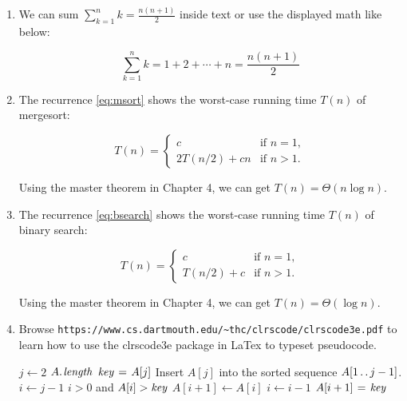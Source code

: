\documentclass[11pt]{article}
\begin{document}
\begin{enumerate}

\itemsep 0.35in

\item We can sum $\sum_{k=1}^{n} k = \frac{ n ( n + 1)}{2} $ inside text or
      use the displayed math like below:
      
      \[
        \sum_{k=1}^{n} k = 1 + 2 + \cdots + n = \frac{ n ( n + 1)}{2}
      \]

\item The recurrence \eqref{eq:msort} shows the worst-case running time $T(n)$ 
      of mergesort:


      \begin{equation} 
         T(n)=\begin{cases}
               c             & \text{if $n = 1$},\\
               2T(n/2) + cn  & \text{if $n > 1$}.  \label{eq:msort}
              \end{cases}
      \end{equation}

      Using the master theorem in Chapter 4, we can 
      get $T(n) = \Theta (n \log{} n)$.

\item The recurrence \eqref{eq:bsearch} shows the worst-case running time $T(n)$
      of binary search:

      \begin{equation} 
         T(n)=\begin{cases}
               c             & \text{if $n = 1$},\\
               T(n/2) + c    & \text{if $n > 1$}.  \label{eq:bsearch}
              \end{cases}
      \end{equation}

      Using the master theorem in Chapter 4, we can 
      get $T(n) = \Theta (\log{} n)$.


\item Browse {\tt https://www.cs.dartmouth.edu/\textasciitilde thc/clrscode/clrscode3e.pdf} 
      to learn how to use the clrscode3e package in LaTex  to typeset 
      pseudocode.  

\begin{codebox}
\li \For $j \gets 2$ \To $\attrib{A}{length}$
\li \Do
        $\id{key} \gets A[j]$
\li \Comment Insert $A[j]$ into the sorted sequence
        $A[1 \mathinner{\ldotp\ldotp} j-1]$.
\li     $i \gets j-1$
\li     \While $i > 0$ and $A[i] > \id{key}$
\li     \Do
            $A[i+1] \gets A[i]$
\li         $i \gets i-1$
        \End
\li     $A[i+1] \gets \id{key}$
    \End
\end{codebox}


   
\end{enumerate}
\end{document}
